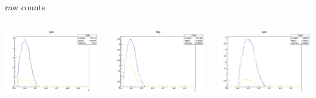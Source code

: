 \begin{frame}{raw counts}
\begin{columns}
\begin{column}[T]{0.25\textwidth}
\includegraphics[width = \textwidth]{results/yield/statistics/yield_x_Q2_z_0.65_5.500_0.40_pos.png}
\end{column}
\begin{column}[T]{0.25\textwidth}
\includegraphics[width = \textwidth]{results/yield/statistics/yield_x_Q2_z_0.65_5.500_0.40_neg.png}
\end{column}
\begin{column}[T]{0.25\textwidth}
\includegraphics[width = \textwidth]{results/yield/statistics/yield_x_Q2_z_0.65_5.500_0.50_pos.png}

\end{column}
\end{columns}
\end{frame}

